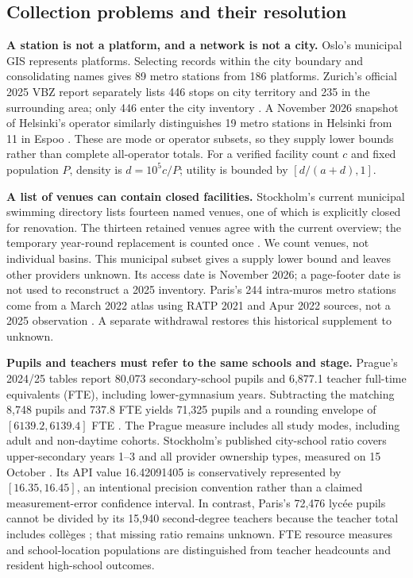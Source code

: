 \subsection{Collection problems and their resolution}
\textbf{A station is not a platform, and a network is not a city.}
Oslo's municipal GIS represents platforms. Selecting records within the city
boundary and consolidating names gives 89 metro stations from 186 platforms.
Zurich's official 2025 VBZ report separately lists 446 stops on city territory
and 235 in the surrounding area; only 446 enter the city inventory
\cite{oslo,vbz}. A November 2026 snapshot of Helsinki's operator similarly
distinguishes 19 metro stations in Helsinki from 11 in Espoo \cite{helsinki}.
These are mode or operator subsets, so they supply
lower bounds rather than complete all-operator totals. For a verified facility
count $c$ and fixed population $P$, density is $d=10^5c/P$; utility is bounded by
$[d/(a+d),1]$.

\textbf{A list of venues can contain closed facilities.}
Stockholm's current municipal swimming directory lists fourteen named venues,
one of which is explicitly closed for renovation. The thirteen retained venues
agree with the current overview; the temporary year-round replacement is
counted once \cite{stockpool}. We count venues, not individual basins. This
municipal subset gives a supply lower bound and leaves other providers unknown.
Its access date is November 2026; a page-footer date is not used to reconstruct
a 2025 inventory. Paris's 244 intra-muros metro stations come from a March 2022
atlas using RATP 2021 and Apur 2022 sources, not a 2025 observation
\cite{apur}. A separate withdrawal restores this historical supplement to unknown.

\textbf{Pupils and teachers must refer to the same schools and stage.}
Prague's 2024/25 tables report 80,073 secondary-school pupils and 6,877.1
teacher full-time equivalents (FTE), including lower-gymnasium years.
Subtracting the matching 8,748 pupils and 737.8 FTE yields 71,325 pupils and
a rounding envelope of $[6139.2,6139.4]$ FTE \cite{prague}. The Prague
measure includes all study modes, including adult and non-daytime cohorts.
Stockholm's
published city-school ratio covers upper-secondary years 1--3 and all provider
ownership types, measured on 15 October \cite{kolada}. Its API value
16.42091405 is conservatively represented by $[16.35,16.45]$, an intentional
precision convention rather than a claimed measurement-error confidence interval.
In contrast, Paris's 72,476 lyc\'ee pupils cannot be divided by its 15,940
second-degree teachers because the teacher total includes coll\`eges
\cite{parisedu}; that missing ratio remains unknown. FTE resource measures
and school-location populations are distinguished from teacher headcounts and
resident high-school outcomes.

